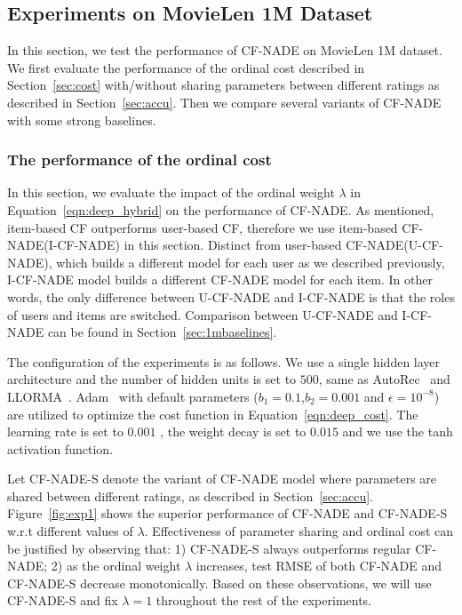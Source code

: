\documentclass{article}
\newcommand{\cfnade}{CF-NADE\xspace}
\begin{document}
\subsection{Experiments on MovieLen 1M Dataset}
\label{sec:movielens1m}

In this section, we test the performance of \cfnade on MovieLen 1M
dataset. We first evaluate the performance of the ordinal cost
described in Section~\ref{sec:cost} with/without sharing parameters
between different ratings as described in Section~\ref{sec:accu}. Then
we compare several variants of \cfnade with some strong baselines.

\subsubsection{The performance of the ordinal cost}
\label{sec:variants}

In this section, we evaluate the impact of the ordinal weight $\lambda$ in
Equation~\ref{eqn:deep_hybrid} on the performance of \cfnade. As
\citet{sedhain2015autorec} mentioned, item-based CF outperforms
user-based CF, therefore we use item-based \cfnade (I-\cfnade) in this
section. Distinct from user-based \cfnade (U-\cfnade), which builds a
different model for each user as we described previously, I-\cfnade
model builds a different \cfnade model for each item. In other words,
the only difference between U-\cfnade and I-\cfnade is that the roles
of users and items are switched. Comparison between U-\cfnade and
I-\cfnade can be found in Section~\ref{sec:1mbaselines}.

The configuration of the experiments is as follows. We use a single
hidden layer architecture and the number of hidden units is set to
$500$, same as AutoRec~\citep{sedhain2015autorec} and
LLORMA~\citep{lee2013local}. Adam~\citep{kingma2014adam} with default
parameters ($b_1=0.1$,$b_2=0.001$ and $\epsilon=10^{-8}$) are utilized
to optimize the cost function in Equation~\ref{eqn:deep_cost}. The
learning rate is set to $0.001$ , the weight decay is set to
$0.015$ and we use the tanh activation function. 

Let {\cfnade}-S denote the variant of \cfnade model where parameters are
shared between different ratings, as described in
Section~\ref{sec:accu}. Figure~\ref{fig:exp1} shows the superior
performance of \cfnade and {\cfnade}-S w.r.t different values of
$\lambda$. Effectiveness of parameter sharing and ordinal cost can be
justified by observing that: 1) {\cfnade}-S always outperforms regular
\cfnade; 2) as the ordinal weight $\lambda$ increases, test RMSE of
both \cfnade and {\cfnade}-S decrease monotonically. Based on these
observations, we will use {\cfnade}-S and fix $\lambda=1$ throughout
the rest of the experiments.
\end{document}
